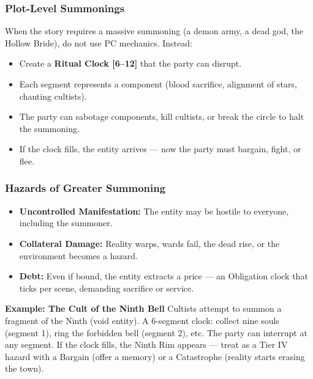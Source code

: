 \subsubsection{Plot-Level Summonings}
When the story requires a massive summoning (a demon army, a dead god, the Hollow Bride), do not use PC mechanics. Instead:
\begin{itemize}
  \item Create a \textbf{Ritual Clock [6–12]} that the party can disrupt.
  \item Each segment represents a component (blood sacrifice, alignment of stars, chanting cultists).
  \item The party can sabotage components, kill cultists, or break the circle to halt the summoning.
  \item If the clock fills, the entity arrives — now the party must bargain, fight, or flee.
\end{itemize}

\subsubsection{Hazards of Greater Summoning}
\begin{itemize}
  \item \textbf{Uncontrolled Manifestation:} The entity may be hostile to everyone, including the summoner.
  \item \textbf{Collateral Damage:} Reality warps, wards fail, the dead rise, or the environment becomes a hazard.
  \item \textbf{Debt:} Even if bound, the entity extracts a price — an Obligation clock that ticks per scene, demanding sacrifice or service.
\end{itemize}

\textbf{Example: The Cult of the Ninth Bell}
Cultists attempt to summon a fragment of the Ninth (void entity). A 6-segment clock: collect nine souls (segment 1), ring the forbidden bell (segment 2), etc. The party can interrupt at any segment. If the clock fills, the Ninth Rim appears — treat as a Tier IV hazard with a Bargain (offer a memory) or a Catastrophe (reality starts erasing the town).

